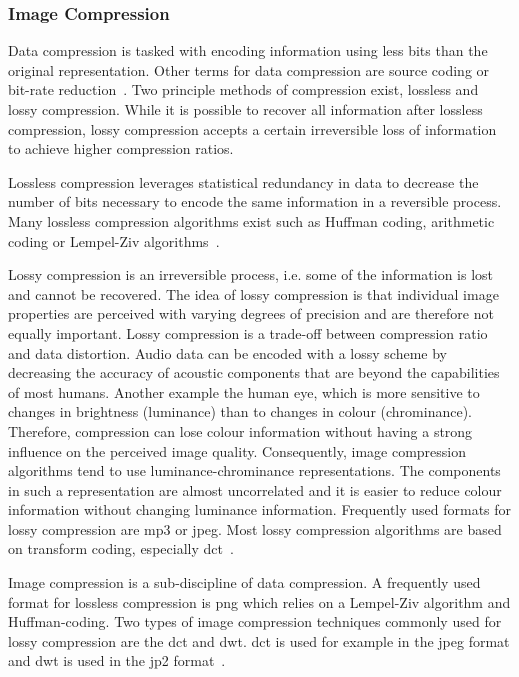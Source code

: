 \subsubsection{Image Compression} \label{sec:t_compress}
Data compression is tasked with encoding information using less bits than the original representation. Other terms for data compression are source coding or bit-rate reduction~\cite{Mahdi2012ImplementingTechnique}. Two principle methods of compression exist, lossless and lossy compression. While it is possible to recover all information after lossless compression, lossy compression accepts a certain irreversible loss of information to achieve higher compression ratios.

Lossless compression leverages statistical redundancy in data to decrease the number of bits necessary to encode the same information in a reversible process. Many lossless compression algorithms exist such as Huffman coding, arithmetic coding or Lempel-Ziv algorithms~\cite{Bocharova2009CompressionMultimedia}.

Lossy compression is an irreversible process, i.e. some of the information is lost and cannot be recovered. The idea of lossy compression is that individual image properties are perceived with varying degrees of precision and are therefore not equally important. Lossy compression is a trade-off between compression ratio and data distortion. Audio data can be encoded with a lossy scheme by decreasing the accuracy of acoustic components that are beyond the capabilities of most humans. Another example the human eye, which is more sensitive to changes in brightness (luminance) than to changes in colour (chrominance). Therefore, compression can lose colour information without having a strong influence on the perceived image quality. Consequently, image compression algorithms tend to use luminance-chrominance representations. The components in such a representation are almost uncorrelated and it is easier to reduce colour information without changing luminance information. Frequently used formats for lossy compression are \gls{mp3} or \gls{jpeg}. Most lossy compression algorithms are based on transform coding, especially \gls{dct}~\cite{Bocharova2009CompressionMultimedia}.

Image compression is a sub-discipline of data compression. A frequently used format for lossless compression is \gls{png} which relies on a Lempel-Ziv algorithm and Huffman-coding. Two types of image compression techniques commonly used for lossy compression are the \gls{dct} and \gls{dwt}. \Gls{dct} is used for example in the \gls{jpeg} format and \gls{dwt} is used in the \gls{jp2} format~\cite{Bocharova2009CompressionMultimedia}.

